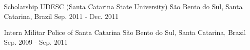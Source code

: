 \begin{cventries}
  \cventry
    {Scholarship} %
    {UDESC (Santa Catarina State University)} %
    {São Bento do Sul, Santa Catarina, Brazil} %
    {Sep. 2011 - Dec. 2011} %
    {
    }

  \cventry
    {Intern} %
    {Militar Police of Santa Catarina} %
    {São Bento do Sul, Santa Catarina, Brazil} %
    {Sep. 2009 - Sep. 2011} %
    {
    }

\end{cventries}
